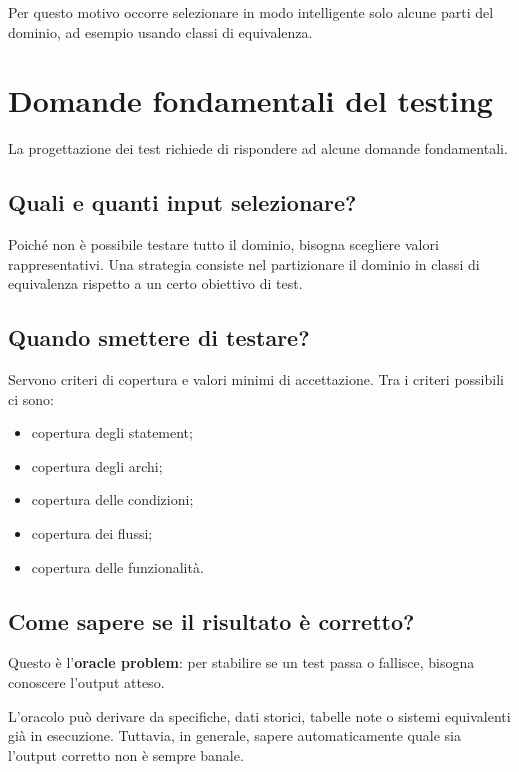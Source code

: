 Per questo motivo occorre selezionare in modo intelligente solo alcune parti del dominio, ad esempio usando classi di equivalenza.

\section{Domande fondamentali del testing}

La progettazione dei test richiede di rispondere ad alcune domande fondamentali.

\subsection{Quali e quanti input selezionare?}

Poiché non è possibile testare tutto il dominio, bisogna scegliere valori rappresentativi. Una strategia consiste nel partizionare il dominio in classi di equivalenza rispetto a un certo obiettivo di test.

\subsection{Quando smettere di testare?}

Servono criteri di copertura e valori minimi di accettazione. Tra i criteri possibili ci sono:

\begin{itemize}
    \item copertura degli statement;
    \item copertura degli archi;
    \item copertura delle condizioni;
    \item copertura dei flussi;
    \item copertura delle funzionalità.
\end{itemize}

\subsection{Come sapere se il risultato è corretto?}

Questo è l'\textbf{oracle problem}: per stabilire se un test passa o fallisce, bisogna conoscere l'output atteso.

\begin{notaprof}
L'oracolo può derivare da specifiche, dati storici, tabelle note o sistemi equivalenti già in esecuzione. Tuttavia, in generale, sapere automaticamente quale sia l'output corretto non è sempre banale.
\end{notaprof}

